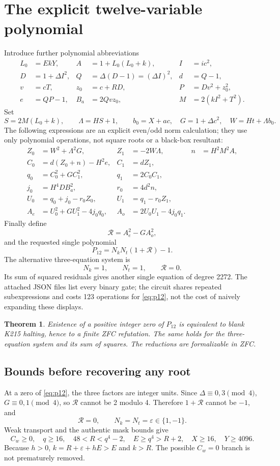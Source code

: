 \documentclass[11 pt]{article}
\newtheorem{theorem}{Theorem}
\begin{document}
\section{The explicit twelve-variable polynomial}
Introduce further polynomial abbreviations
\begin{align*}
L_0&=EkY,& A&=1+L_0(L_0+k),& I&=ic^2,\\
D&=1+\Delta I^2,& Q&=\Delta(D-1)=(\Delta I)^2,&d&=Q-1,\\
v&=cT,&z_0&=c+RD,&P&=Dv^2+z_0^2,\\
e&=QP-1,&B_a&=2 Qvz_0,&M&=2(kI^2+T^2).
\end{align*}
Set
\[
S=2 M(L_0+k),\qquad \Lambda=HS+1,\qquad
b_0=X+ac,\quad G=1+\Delta c^2,\quad W=Ht+\Lambda b_0.
\]
The following expressions are an explicit even/odd norm calculation; they use only polynomial operations, not square roots or a black-box resultant:
\begin{align*}
Z_0&=W^2+\Lambda^2 G,& Z_1&=-2 W\Lambda,& n&=H^2 M^2 A,\\
C_0&=d(Z_0+n)-H^2 e,& C_1&=dZ_1,&&\\
q_0&=C_0^2+GC_1^2,& q_1&=2 C_0 C_1,&&\\
j_0&=H^4 DB_a^2,&r_0&=4 d^2 n,&&\\
U_0&=q_0+j_0-r_0 Z_0,&U_1&=q_1-r_0 Z_1,&&\\
A_e&=U_0^2+GU_1^2-4 j_0 q_0,& A_o&=2 U_0 U_1-4 j_0 q_1.&&
\end{align*}
Finally define
\begin{equation}\label{eq:res}
\mathcal R=A_e^2-GA_o^2,
\end{equation}
and the requested single polynomial
\begin{equation}\label{eq:p12}
\boxed{P_{12}=N_kN_t(1+\mathcal R)-1.}
\end{equation}
The alternative three-equation system is
\[
N_k=1,\qquad N_t=1,\qquad\mathcal R=0.
\]
Its sum of squared residuals gives another single equation of degree 2272. The attached JSON files list every binary gate; the circuit shares repeated subexpressions and costs 123 operations for \eqref{eq:p12}, not the cost of naively expanding these displays.

\begin{theorem}\label{thm:12}
Existence of a positive integer zero of $ P_{12}$ is equivalent to blank K215 halting, hence to a finite ZFC refutation. The same holds for the three-equation system and its sum of squares. The reductions are formalizable in ZFC.
\end{theorem}
\subsection{Bounds before recovering any root}
At a zero of \eqref{eq:p12}, the three factors are integer units. Since $\Delta\equiv 0,3\pmod 4 $, $ G\equiv 0,1\pmod 4 $, so $\mathcal R $ cannot be 2 modulo 4. Therefore $ 1+\mathcal R $ cannot be $-1 $, and
\[
\mathcal R=0,\qquad N_k=N_t=\varepsilon\in\{1,-1\}.
\]
Weak transport and the authentic mask bounds give
\[
C_w\ge 0,\quad q\ge 16,\quad 48<R<q^4-2,\quad E\ge q^4>R+2,
\quad X\ge 16,\quad Y\ge 4096.
\]
Because $ h>0 $, $ k=R+\varepsilon+hE>E $ and $ k>R $. The possible $ C_w=0 $ branch is not prematurely removed.
\end{document}
